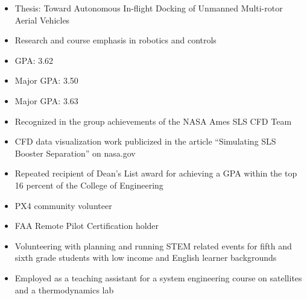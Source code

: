 
\begin{itemize}
  \item Thesis: Toward Autonomous In-flight Docking of Unmanned Multi-rotor Aerial Vehicles
  \item Research and course emphasis in robotics and controls
  \item GPA: 3.62
\end{itemize}
\divider

\begin{itemize}
  \item Major GPA: 3.50
\end{itemize}
\smallskip
{}
\begin{itemize}
  \item Major GPA: 3.63
\end{itemize}

\par\medskip
{}
\par\medskip
{}

\begin{itemize}
    \item Recognized in the group achievements of the NASA Ames SLS CFD Team
    \item CFD data visualization work publicized in the article “Simulating SLS Booster Separation” on nasa.gov
    \item Repeated recipient of Dean’s List award for achieving a GPA within the top 16 percent of the College of Engineering
\end{itemize}

\begin{itemize}
    \item PX4 community volunteer
    \item FAA Remote Pilot Certification holder
    \item Volunteering with planning and running STEM related events for fifth and sixth grade students with low income and English learner backgrounds 
    \item Employed as a teaching assistant for a system engineering course on satellites and a thermodynamics lab
\end{itemize}
